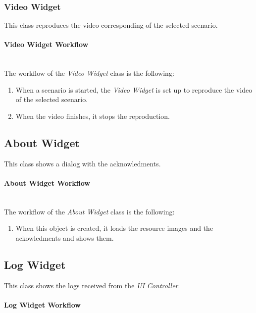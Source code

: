 \subsubsection{Video Widget}

This class reproduces the video corresponding of the selected scenario. 

\paragraph{Video Widget Workflow}~\\

The workflow of the \emph{Video Widget} class is the following:
\begin{enumerate}
\item When a scenario is started, the \emph{Video Widget} is set up to reproduce the video of the selected scenario.\item When the video finishes, it stops the reproduction.
\end{enumerate}


\subsection{About Widget}
This class shows a dialog with the acknowledments. 

\paragraph{About Widget  Workflow}~\\

The workflow of the \emph{About Widget} class is the following:
\begin{enumerate}
\item When this object is created, it loads the resource images and the ackowledments and shows them.
\end{enumerate}

\subsection{Log Widget}

This class shows the logs received from the \emph{UI Controller}. 

\paragraph{Log Widget  Workflow}~\\

